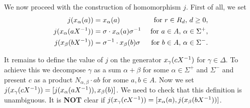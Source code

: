 We now proceed with the construction of homomorphism $j$.
First of all, we set
\begin{align}
    j(x_\alpha(a))       & = x_\alpha(a) & \text{ for } r \in R_d,\, d \geq 0, \\
    j(x_\alpha(a X^{-1})) & = \sigma \cdot x_\alpha(a) \sigma^{-1} & \text{ for } a \in A,\, \alpha \in \Sigma^+, \\
    j(x_\beta(bX ^{-1}))  & = \sigma^{-1} \cdot x_\beta(b) \sigma & \text{ for } b \in A,\, \alpha \in \Sigma^-.
\end{align}

It remains to define the value of $j$ on the generator $x_\gamma(cX^{-1})$ for $\gamma \in \Delta$.
To achieve this we decompose $\gamma$ as a sum $\alpha + \beta$ for some $\alpha \in \Sigma^+$ and $\Sigma^-$
 and present $c$ as a product $N_{\alpha, \beta} \cdot a b$ for some $a, b \in A$. %
Now we set $j(x_\gamma(c X^{-1})) = [j(x_\alpha(a X^{-1})), x_\beta(b)]$.
We need to check that this definition is unambiguous.
It is \textbf{NOT} clear if $j(x_\gamma(c X^{-1})) = [x_\alpha(a), j(x_\beta(bX^{-1}))]$.
